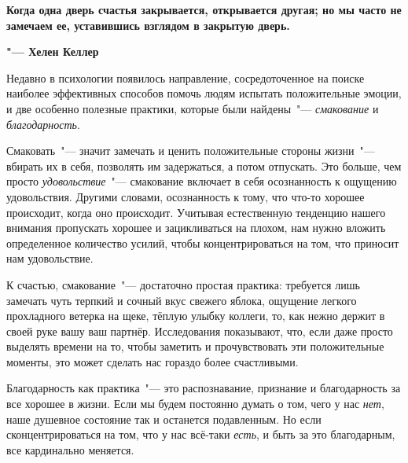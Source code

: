 \begin{center}
	\textbf{
		Когда одна дверь счастья закрывается, открывается другая; но мы часто не замечаем ее, уставившись взглядом в закрытую дверь.
	} \cite{119}
	
	\textbf{"--- Хелен Келлер}
\end{center}


Недавно в психологии появилось направление, сосредоточенное на поиске наиболее эффективных способов помочь людям испытать положительные эмоции, и две особенно полезные практики, которые были найдены~"--- \emph{смакование} и \emph{благодарность}.

\vspace{3ex}


\vspace{1ex}

Смаковать~"--- значит замечать и ценить положительные стороны жизни~"--- вбирать их в себя, позволять им задержаться, а потом отпускать. Это больше, чем просто \emph{удовольствие}~"--- смакование включает в себя осознанность к ощущению удовольствия\cite{120}. Другими словами, осознанность к тому, что что-то хорошее происходит, когда оно происходит. Учитывая естественную тенденцию нашего внимания пропускать хорошее и зацикливаться на плохом, нам нужно вложить определенное количество усилий, чтобы концентрироваться на том, что приносит нам удовольствие.

К счастью, смакование~"--- достаточно простая практика: требуется лишь замечать чуть терпкий и сочный вкус свежего яблока, ощущение легкого прохладного ветерка на щеке, тёплую улыбку коллеги, то, как нежно держит в своей руке вашу ваш партнёр. Исследования показывают, что, если даже просто выделять времени на то, чтобы заметить и прочувствовать эти положительные моменты, это может сделать нас гораздо более счастливыми\cite{121}.


\vspace{3ex}


\vspace{1ex}

Благодарность как практика~"--- это распознавание, признание и благодарность за все хорошее в жизни\cite{122}. Если мы будем постоянно думать о том, чего у нас \emph{нет}, наше душевное состояние так и останется подавленным. Но если сконцентрироваться на том, что у нас всё-таки \emph{есть}, и быть за это благодарным, все кардинально меняется.

